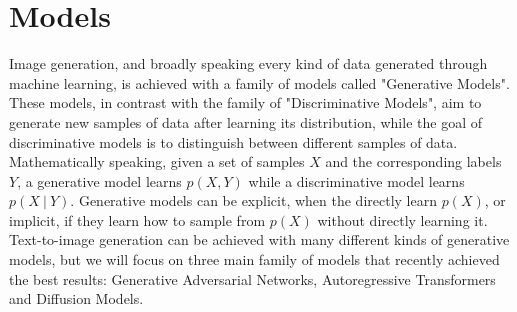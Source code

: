 \documentclass[conference]{IEEEtran}
\begin{document}
\section{Models}
Image generation, and broadly speaking every kind of data generated through machine learning, is achieved with a family of models called "Generative Models". These models, in contrast with the family of "Discriminative Models", aim to generate new samples of data after learning its distribution, while the goal of discriminative models is to distinguish between different samples of data. Mathematically speaking, given a set of samples $X$ and the corresponding labels $Y$, a generative model learns $p(X, Y)$ while a discriminative model learns $p(X\:|\:Y)$. Generative models can be explicit, when the directly learn $p(X)$, or implicit, if they learn how to sample from $p(X)$ without directly learning it.\\
Text-to-image generation can be achieved with many different kinds of generative models, but we will focus on three main family of models that recently achieved the best results: Generative Adversarial Networks, Autoregressive Transformers and Diffusion Models.
\end{document}
